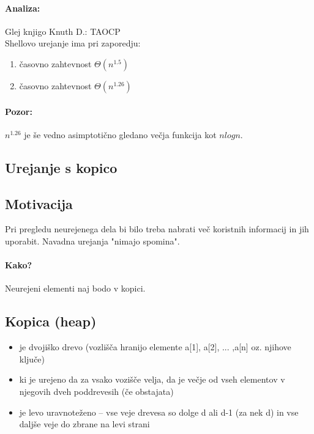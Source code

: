 \documentclass[a4paper,10pt]{article}
\begin{document}
\paragraph{Analiza:} Glej knjigo Knuth D.: TAOCP \cite{knuth98}\\
Shellovo urejanje ima pri zaporedju:
\begin{enumerate}
\item \v casovno zahtevnost $\Theta (n^{1.5})$
\item \v casovno zahtevnost $\Theta (n^{1.26})$
\end{enumerate}

\paragraph{Pozor:} $n^{1.26}$ je \v se vedno asimptoti\v cno gledano ve\v cja funkcija kot $n log n$.

\subsection{Urejanje s kopico}

\subsection{Motivacija}

Pri pregledu neurejenega dela bi bilo treba nabrati ve\v c koristnih informacij in jih uporabit. Navadna urejanja "nimajo spomina".

\paragraph{Kako?} Neurejeni elementi naj bodo v kopici.

\subsection{Kopica (heap)}

\begin{itemize}
\item je dvoji\v sko drevo (vozli\v s\v ca hranijo elemente a[1], a[2], ... ,a[n]  oz. njihove klju\v ce)
\item ki je urejeno da za vsako vozi\v s\v ce velja, da je ve\v cje od vseh elementov v njegovih dveh poddrevesih (\v ce obstajata)
\item je levo uravnote\v zeno – vse veje drevesa so dolge d ali d-1 (za nek d) in vse dalj\v se veje do zbrane na levi strani
\end{itemize}
\end{document}
